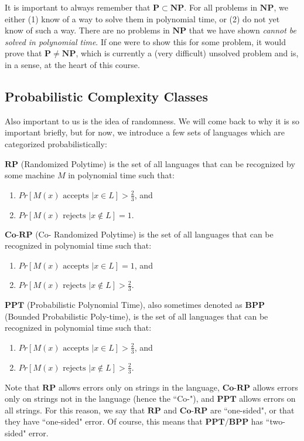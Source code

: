 \documentclass[11pt]{article}
\renewcommand{\P}{\mathbf{P}}
\newcommand{\NP}{\mathbf{NP}}
\newcommand{\RP}{\mathbf{RP}}
\newcommand{\CoRP}{\textbf{Co-}\mathbf{RP}}
\newcommand{\PPT}{\mathbf{PPT}}
\newcommand{\BPP}{\mathbf{BPP}}
\begin{document}
It is important to always remember that \(\P\subset \NP\). For all problems in \(\NP\), we either (1) know of a way to solve them in polynomial time, or (2) do not yet know of such a way. There are no problems in \(\NP\) that we have shown \emph{cannot be solved in polynomial time}. If one were to show this for some problem, it would prove that \(\P\ne\NP\), which is currently a (very difficult) unsolved problem and is, in a sense, at the heart of this course.



\newpage
\subsection{Probabilistic Complexity Classes}

Also important to us is the idea of randomness. We will come back to why it is so important briefly, but for now, we introduce a few sets of languages which are categorized probabilistically:\bigskip

\underline{\(\RP\)} (Randomized Polytime) is the set of all languages that can be recognized by some machine \(M\) in polynomial time such that:
\begin{enumerate}
\item \(Pr[M(x)\text{ accepts }|x\in L]>\frac{2}{3}\), and 
\item \(Pr[M(x)\text{ rejects }|x\notin L]=1.\)
\end{enumerate}\medskip

\underline{\(\CoRP\)} (Co- Randomized Polytime) is the set of all languages that can be recognized in polynomial time such that:
\begin{enumerate}
\item \(Pr[M(x)\text{ accepts }|x\in L]=1\), and 
\item \(Pr[M(x)\text{ rejects }|x\notin L]>\frac{2}{3}.\)
\end{enumerate}\medskip

\underline{\(\mathbf{PPT}\)} (Probabilistic Polynomial Time), also sometimes denoted as \(\BPP\) (Bounded Probabilistic Poly-time), is the set of all languages that can be recognized in polynomial time such that: 
\begin{enumerate}
\item \(Pr[M(x)\text{ accepts }|x\in L]>\frac{2}{3}\), and 
\item \(Pr[M(x)\text{ rejects }|x\notin L]>\frac{2}{3}.\)
\end{enumerate}\bigskip

Note that \(\RP\) allows errors only on strings in the language, \(\CoRP\) allows errors only on strings not in the language (hence the ``Co-"), and \(\PPT\) allows errors on all strings. For this reason, we say that \(\RP\) and \(\CoRP\) are ``one-sided", or that they have ``one-sided" error. Of course, this means that \(\PPT/\BPP\) has ``two-sided" error.\medskip
\end{document}
